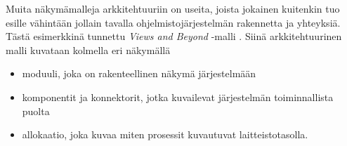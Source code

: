 \documentclass[finnish]{tktltiki2}
\theoremstyle{definition}
\theoremstyle{remark}
\begin{document}

Muita näkymämalleja arkkitehtuuriin on useita, joista jokainen kuitenkin tuo esille vähintään jollain tavalla ohjelmistojärjestelmän rakennetta ja yhteyksiä. Tästä esimerkkinä tunnettu \textit{Views and Beyond} -malli \citep[s.8]{gorton_understanding_2011}. Siinä arkkitehtuurinen malli kuvataan kolmella eri näkymällä

\begin{itemize}
	\item moduuli, joka on rakenteellinen näkymä järjestelmään
	\item komponentit ja konnektorit, jotka kuvailevat järjestelmän toiminnallista puolta
	\item allokaatio, joka kuvaa miten prosessit kuvautuvat laitteistotasolla.
\end{itemize}

\end{document}
